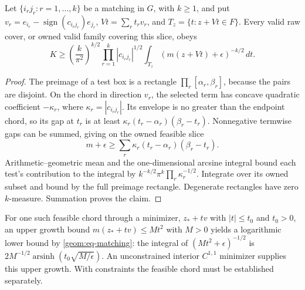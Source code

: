 \begin{proposition}\label{geom:prop-matching}
Let $\{i_rj_r:r=1,\ldots,k\}$ be a matching in $G$, with $k\geq1$, and put
$v_r=e_{i_r}-\operatorname{sign}(c_{i_rj_r})e_{j_r}$,
$Vt=\sum_r t_rv_r$, and $T_z=\{t:z+Vt\in F\}$.
Every valid raw cover, or owned valid family covering this slice, obeys
\begin{equation}\label{geom:eq-matching}
 K\geq\left(\frac{k}{\pi^2}\right)^{k/2}
       \prod_{r=1}^k|c_{i_rj_r}|^{1/2}
       \int_{T_z}(m(z+Vt)+\epsilon)^{-k/2}\,dt.
\end{equation}
\end{proposition}
\begin{proof}
The preimage of a test box is a rectangle
$\prod_r[\alpha_r,\beta_r]$, because the pairs are disjoint.
On the chord in direction $v_r$, the selected term has concave
quadratic coefficient $-\kappa_r$, where $\kappa_r=|c_{i_rj_r}|$.
Its envelope is no greater than the endpoint chord, so its gap at
$t_r$ is at least
$\kappa_r(t_r-\alpha_r)(\beta_r-t_r)$. Nonnegative termwise gaps
can be summed, giving on the owned feasible slice
\[
 m+\epsilon\geq\sum_r\kappa_r
                         (t_r-\alpha_r)(\beta_r-t_r).
\]
Arithmetic--geometric mean and the one-dimensional arcsine integral
bound each test's contribution to the integral by
$k^{-k/2}\pi^k\prod_r\kappa_r^{-1/2}$. Integrate over its owned subset
and bound by the full preimage rectangle. Degenerate rectangles have
zero $k$-measure. Summation proves the claim.
\end{proof}

For one such feasible chord through a minimizer,
$z_*+tv$ with $|t|\leq t_0$ and $t_0>0$, an upper growth bound
$m(z_*+tv)\leq Mt^2$ with $M>0$ yields a logarithmic lower bound by
\cref{geom:eq-matching}: the integral of $(Mt^2+\epsilon)^{-1/2}$ is
$2M^{-1/2}\operatorname{arsinh}(t_0\sqrt{M/\epsilon})$.
An unconstrained interior $C^{1,1}$ minimizer supplies this upper growth.
With constraints the feasible chord must be established separately.

